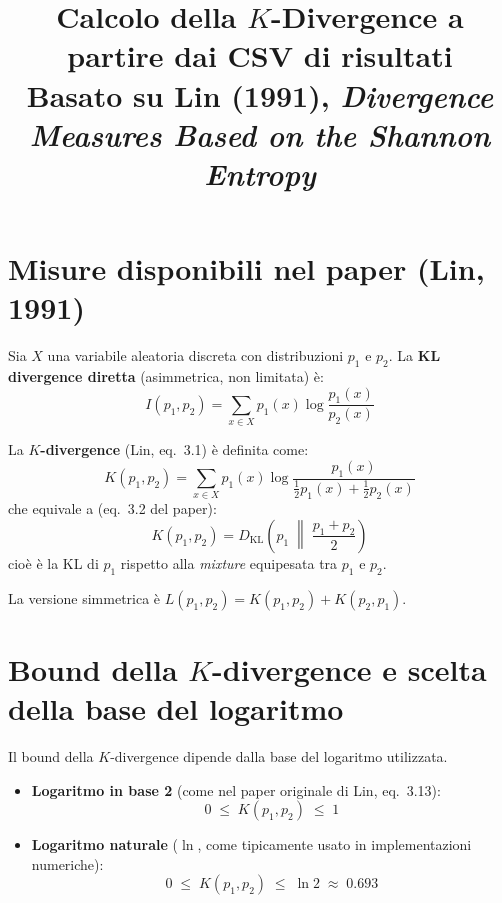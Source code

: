 \documentclass[12pt, a4paper]{article}
\title{Calcolo della \(K\)-Divergence a partire dai CSV di risultati\\
\large Basato su Lin (1991), \textit{Divergence Measures Based on the Shannon Entropy}}
\author{}
\date{}
\begin{document}
\maketitle

\section{Misure disponibili nel paper (Lin, 1991)}

Sia \(X\) una variabile aleatoria discreta con distribuzioni \(p_1\) e \(p_2\).
La \textbf{KL divergence diretta} (asimmetrica, non limitata) è:
\begin{equation}
    I(p_1, p_2) = \sum_{x \in X} p_1(x) \log \frac{p_1(x)}{p_2(x)}
    \label{eq:kl}
\end{equation}

La \textbf{\(K\)-divergence} (Lin, eq.\ 3.1) è definita come:
\begin{equation}
    K(p_1, p_2) = \sum_{x \in X} p_1(x) \log \frac{p_1(x)}{\frac{1}{2}p_1(x) + \frac{1}{2}p_2(x)}
    \label{eq:k_divergence}
\end{equation}
che equivale a (eq.\ 3.2 del paper):
\begin{equation}
    K(p_1, p_2) = D_{\mathrm{KL}}\!\left(p_1 \;\middle\|\; \frac{p_1 + p_2}{2}\right)
    \label{eq:k_as_kl}
\end{equation}
cioè è la KL di \(p_1\) rispetto alla \emph{mixture} equipesata tra \(p_1\) e \(p_2\).

\medskip
La versione simmetrica è \(L(p_1, p_2) = K(p_1, p_2) + K(p_2, p_1)\).

\section{Bound della \(K\)-divergence e scelta della base del logaritmo}

Il bound della \(K\)-divergence dipende dalla base del logaritmo utilizzata.

\begin{itemize}
    \item \textbf{Logaritmo in base 2} (come nel paper originale di Lin, eq.\ 3.13):
    \begin{equation}
        0 \;\leq\; K(p_1, p_2) \;\leq\; 1
        \label{eq:bounded_log2}
    \end{equation}

    \item \textbf{Logaritmo naturale} (\(\ln\), come tipicamente usato in implementazioni numeriche):
    \begin{equation}
        0 \;\leq\; K(p_1, p_2) \;\leq\; \ln 2 \;\approx\; 0.693
        \label{eq:bounded_ln}
    \end{equation}
\end{itemize}
\end{document}
